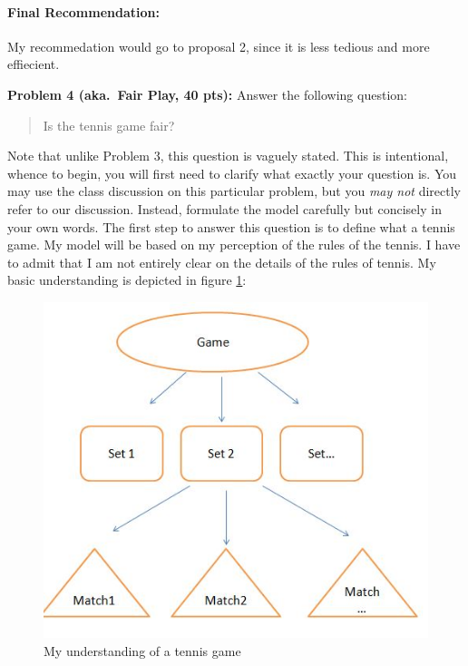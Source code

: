 \documentclass[12pt]{article}
\begin{document}
\paragraph {Final Recommendation:} 
My recommedation would go to proposal 2, since it is less tedious and more effiecient.

\vskip0.25in
\noindent\textbf{Problem 4 (aka.\ Fair Play, 40 pts):}
Answer the following question:
\begin{verse}
Is the tennis game fair?
\end{verse}
Note that unlike Problem 3, this question is vaguely stated.
This is intentional, whence to begin, you will first need to clarify
what exactly your question is.
You may use the class discussion on this particular 
problem, but you \emph{may not} directly refer to our 
discussion.  Instead, formulate the model carefully but concisely in 
your own words.   \newline \newline
The first step to answer this question is to define what a tennis game. My model will be based on my perception of the rules of the tennis. I have to admit that I am not entirely clear on the details of the rules of tennis. My basic understanding is depicted in figure \ref{fig:tennis}: 
\begin{figure}[h]
    \begin{center}
        \includegraphics{tennis.jpg}
    \end{center}
    \caption{My understanding of a tennis game}
    \label{fig:tennis}
\end{figure}
\newline
\newline 
\newline 
\end{document}
